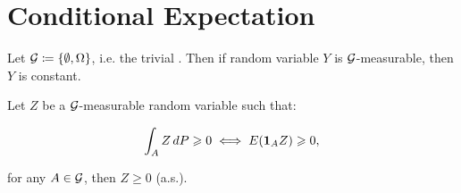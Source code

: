 
\section{Conditional Expectation}

\begin{exercise}{8.1}{}

    Let $\mathcal{G} \coloneqq \{\emptyset, \Omega\}$, i.e. the trivial \SigmaAlgebra. Then if random variable $Y$ is $\mathcal{G}$-measurable, then $Y$ is constant.

\end{exercise}

\begin{lemma}{8.2}{}

    Let $Z$ be a $\mathcal{G}$-measurable random variable such that:

        \begin{align*}
            \int_{A} Z \, dP \geqslant 0 \iff E(\mathbf{1}_{A}Z) \geqslant 0,
        \end{align*}

    for any $A \in \mathcal{G}$, then $Z \geq 0$ (a.s.).

\end{lemma}

